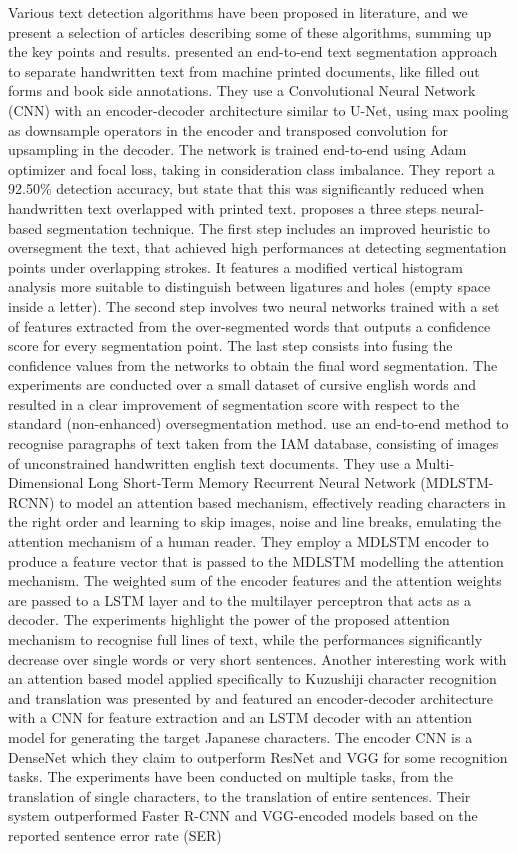 Various text detection algorithms have  been proposed in literature, and we present a selection of articles describing some of these algorithms, summing up the key points and results. \cite{Jo2019-qb} presented an end-to-end text segmentation approach to separate handwritten text from machine printed documents, like filled out forms and book side annotations. They use a Convolutional Neural Network (CNN) with an encoder-decoder architecture similar to U-Net, using max pooling as downsample operators in the encoder and transposed convolution for upsampling in the decoder. The network is trained end-to-end using Adam optimizer and focal loss, taking in consideration class imbalance. They report a 92.50\% detection accuracy, but state that this was significantly reduced when handwritten text overlapped with printed text. \cite{Blumenstein2008-we} proposes a three steps neural-based segmentation technique. The first step includes an improved heuristic to oversegment the text, that achieved high performances at detecting segmentation points under overlapping strokes. It features a modified vertical histogram analysis more suitable to distinguish between ligatures and holes (empty space inside a letter). The second step involves two neural networks trained with a set of features extracted from the over-segmented words that outputs a confidence score for every segmentation point. The last step consists into fusing the confidence values from the networks to obtain the final word segmentation. The experiments are conducted over a small dataset of cursive english words and resulted in a clear improvement of segmentation score with respect to the standard (non-enhanced) oversegmentation method. \cite{Bluche2016-pt} use an end-to-end method to recognise paragraphs of text taken from the IAM database, consisting of images of unconstrained handwritten english text documents. They use a Multi-Dimensional Long Short-Term Memory Recurrent Neural Network (MDLSTM-RCNN) to model an attention based mechanism, effectively reading characters in the right order and learning to skip images, noise and line breaks, emulating the attention mechanism of a human reader. They employ a MDLSTM encoder to produce a feature vector that is passed to the MDLSTM modelling the attention mechanism. The weighted sum of the encoder features and the attention weights are passed to a LSTM layer and to the multilayer perceptron that acts as a decoder. The experiments highlight the power of the proposed attention mechanism to recognise full lines of text, while the performances significantly decrease over single words or very short sentences. Another interesting work with an attention based model applied specifically to Kuzushiji character recognition and translation was presented by \cite{Clanuwat2018-vm} and featured an encoder-decoder architecture with a CNN for feature extraction and an LSTM decoder with an attention model for generating the target Japanese characters. The encoder CNN is a DenseNet which they claim to outperform ResNet and VGG for some recognition tasks. The experiments have been conducted on multiple tasks, from the translation of single characters, to the translation of entire sentences. Their system outperformed Faster R-CNN and VGG-encoded models based on the reported sentence error rate (SER) 